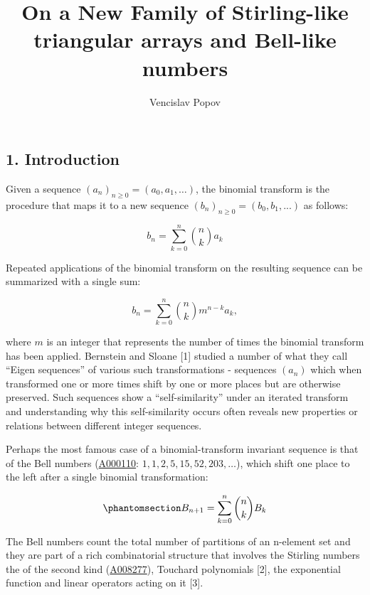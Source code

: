 \documentclass[
  letterpaper,
  DIV=11,
  numbers=noendperiod]{scrartcl}
\title{On a New Family of Stirling-like triangular arrays and Bell-like
numbers}
\author{Vencislav Popov}
\date{}
\begin{document}
\maketitle


\usepackage{amsmath}
\usepackage{logix}
\newcommand{\Stirling}[0]{\genfrac\{\}{0pt}{}}
\newcommand{\mStirling}[0]{\genfrac{\lfloor}{\rfloor}{0pt}{}}

\subsection{1. Introduction}\label{introduction}

Given a sequence \((a_n)_{n \geq 0} = (a_0, a_1, \ldots)\), the binomial
transform is the procedure that maps it to a new sequence
\((b_n)_{n \geq 0} = (b_0,b_1,...)\) as follows:

\[
b_n = \sum_{k=0}^{n} \binom{n}{k} a_k
\]

Repeated applications of the binomial transform on the resulting
sequence can be summarized with a single sum:

\[
b_n = \sum_{k=0}^{n} \binom{n}{k} m^{n-k} a_k,
\]

where \(m\) is an integer that represents the number of times the
binomial transform has been applied. Bernstein and Sloane {[}1{]}
studied a number of what they call ``Eigen sequences'' of various such
transformations - sequences \((a_n)\) which when transformed one or more
times shift by one or more places but are otherwise preserved. Such
sequences show a ``self-similarity'' under an iterated transform and
understanding why this self-similarity occurs often reveals new
properties or relations between different integer sequences.

Perhaps the most famous case of a binomial-transform invariant sequence
is that of the Bell numbers (\href{https://oeis.org/A000110}{A000110}:
\(1, 1, 2, 5, 15, 52, 203, \ldots\)), which shift one place to the left
after a single binomial transformation:

\begin{equation}\phantomsection\label{eq-bell-recurrence}{
B_{n+1} = \sum_{k=0}^{n} \binom{n}{k} B_k
}\end{equation}

The Bell numbers count the total number of partitions of an n-element
set and they are part of a rich combinatorial structure that involves
the Stirling numbers the of the second kind
(\href{https://oeis.org/A008277}{A008277}), Touchard polynomials
{[}2{]}, the exponential function and linear operators acting on it
{[}3{]}.
\end{document}
